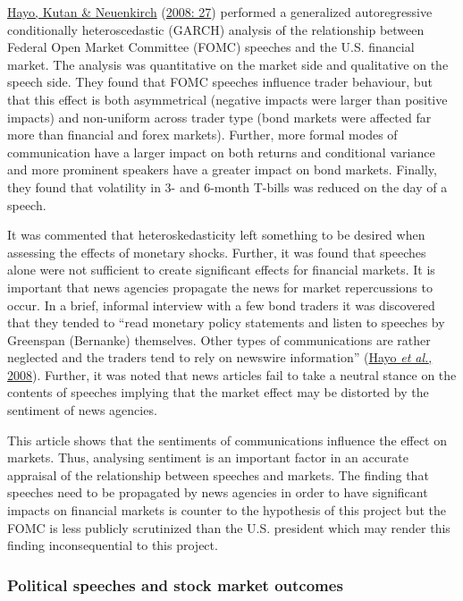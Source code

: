 \documentclass[11pt,preprint, authoryear]{elsarticle}
\numberwithin{equation}{section}
\numberwithin{figure}{section}
\numberwithin{table}{section}
\begin{document}
\protect\hyperlink{ref-hayo2008communicating}{Hayo, Kutan \& Neuenkirch}
(\protect\hyperlink{ref-hayo2008communicating}{2008: 27}) performed a
generalized autoregressive conditionally heteroscedastic (GARCH)
analysis of the relationship between Federal Open Market Committee
(FOMC) speeches and the U.S. financial market. The analysis was
quantitative on the market side and qualitative on the speech side. They
found that FOMC speeches influence trader behaviour, but that this
effect is both asymmetrical (negative impacts were larger than positive
impacts) and non-uniform across trader type (bond markets were affected
far more than financial and forex markets). Further, more formal modes
of communication have a larger impact on both returns and conditional
variance and more prominent speakers have a greater impact on bond
markets. Finally, they found that volatility in 3- and 6-month T-bills
was reduced on the day of a speech.

It was commented that heteroskedasticity left something to be desired
when assessing the effects of monetary shocks. Further, it was found
that speeches alone were not sufficient to create significant effects
for financial markets. It is important that news agencies propagate the
news for market repercussions to occur. In a brief, informal interview
with a few bond traders it was discovered that they tended to ``read
monetary policy statements and listen to speeches by Greenspan
(Bernanke) themselves. Other types of communications are rather
neglected and the traders tend to rely on newswire information''
(\protect\hyperlink{ref-hayo2008communicating}{Hayo \emph{et al.},
2008}). Further, it was noted that news articles fail to take a neutral
stance on the contents of speeches implying that the market effect may
be distorted by the sentiment of news agencies.

This article shows that the sentiments of communications influence the
effect on markets. Thus, analysing sentiment is an important factor in
an accurate appraisal of the relationship between speeches and markets.
The finding that speeches need to be propagated by news agencies in
order to have significant impacts on financial markets is counter to the
hypothesis of this project but the FOMC is less publicly scrutinized
than the U.S. president which may render this finding inconsequential to
this project.

\hypertarget{political-speeches-and-stock-market-outcomes}{%
\subsubsection{\texorpdfstring{Political speeches and stock market
outcomes
\label{Political speeches}}{Political speeches and stock market outcomes }}\label{political-speeches-and-stock-market-outcomes}}
\end{document}
